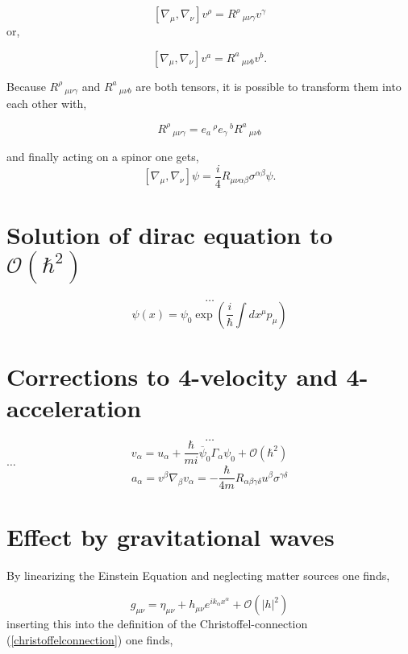 \documentclass[12pt,a4paper]{article}
\begin{document}
	$$
	[\nabla_\mu, \nabla_\nu]v^\rho =  R^\rho\,_{\mu \nu \gamma } v^\gamma
	$$
	or,
	
	$$
	[\nabla_\mu, \nabla_\nu]v^a =  R^a\,_{\mu \nu b } v^b.
	$$
	
	Because $R^\rho\,_{\mu \nu \gamma }$ and $R^a\,_{\mu \nu b }$ are both tensors, it is possible to transform them into each other with,
	
	$$
	R^\rho\,_{\mu \nu \gamma } = e_a\,^\rho e_\gamma\,^b R^a\,_{\mu \nu b }
	$$
	
	and finally acting on a spinor one gets,
	$$
	[\nabla_\mu, \nabla_\nu]\psi = \frac{i}{4} R_{\mu \nu \alpha \beta} \sigma^{\alpha \beta} \psi.
	$$
	
	
	
	\section{Solution of dirac equation to $\mathcal{O} (\hbar^2)$}
	$$
	\ldots
	$$
	\begin{equation}
		\label{solution_to_diraceq}
		\psi(x) = \psi_0 \exp\left(\frac{i}{\hbar}\int dx^\mu p_\mu\right)
	\end{equation}
	\section{Corrections to 4-velocity and 4-acceleration}
	$$
	\ldots
	$$
	\begin{equation}
		\label{correction_to_v}
		v_\alpha = u_\alpha + \frac{\hbar}{mi}\overbar{\psi}_0 \Gamma_\alpha \psi_0 +\mathcal{O} (\hbar^2)
	\end{equation}
	$\ldots$
	\begin{equation}
		\label{correction_to_a}
		a_\alpha = v^\beta \nabla_\beta v_\alpha =  -\frac{\hbar}{4m} R_{\alpha \beta \gamma \delta}u^\beta \sigma^{\gamma \delta}
	\end{equation}
	
	
	
	\section{Effect by gravitational waves}
	By linearizing the Einstein Equation and neglecting matter sources one finds,
	
	$$
	g_{\mu \nu } = \eta_{\mu \nu } + h_{\mu \nu }e^{i k_\alpha x^\alpha} + \mathcal{O}(|h|^2)
	$$
	inserting this into the definition of the Christoffel-connection (\ref{christoffelconnection}) one finds,
	
\end{document}
